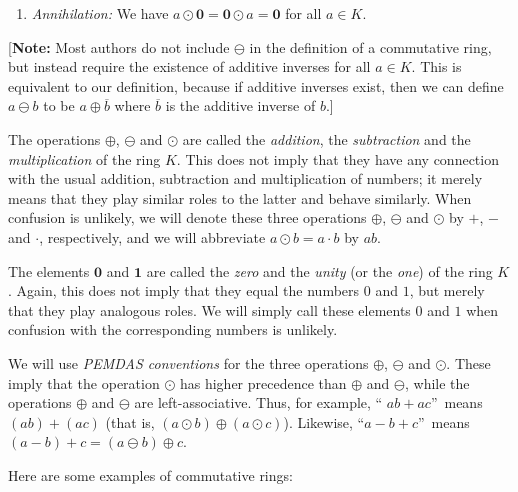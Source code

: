 \begin{definition}
\begin{enumerate}
\item \emph{Annihilation:} We have $a\odot\mathbf{0}=\mathbf{0}\odot
a=\mathbf{0}$ for all $a\in K$.
\end{enumerate}

[\textbf{Note:} Most authors do not include $\ominus$ in the definition of a
commutative ring, but instead require the existence of additive inverses for
all $a\in K$. This is equivalent to our definition, because if additive
inverses exist, then we can define $a\ominus b$ to be $a\oplus\overline{b}$
where $\overline{b}$ is the additive inverse of $b$.]

The operations $\oplus$, $\ominus$ and $\odot$ are called the \emph{addition},
the \emph{subtraction} and the \emph{multiplication} of the ring $K$. This
does not imply that they have any connection with the usual addition,
subtraction and multiplication of numbers; it merely means that they play
similar roles to the latter and behave similarly. When confusion is unlikely,
we will denote these three operations $\oplus$, $\ominus$ and $\odot$ by $+$,
$-$ and $\cdot$, respectively, and we will abbreviate $a\odot b=a\cdot b$ by
$ab$.

The elements $\mathbf{0}$ and $\mathbf{1}$ are called the \emph{zero} and the
\emph{unity} (or the \emph{one}) of the ring $K$. Again, this does not imply
that they equal the numbers $0$ and $1$, but merely that they play analogous
roles. We will simply call these elements $0$ and $1$ when confusion with the
corresponding numbers is unlikely.

We will use \emph{PEMDAS conventions} for the three operations $\oplus$,
$\ominus$ and $\odot$. These imply that the operation $\odot$ has higher
precedence than $\oplus$ and $\ominus$, while the operations $\oplus$ and
$\ominus$ are left-associative. Thus, for example, \textquotedblleft%
$ab+ac$\textquotedblright\ means $\left(  ab\right)  +\left(  ac\right)  $
(that is, $\left(  a\odot b\right)  \oplus\left(  a\odot c\right)  $).
Likewise, \textquotedblleft$a-b+c$\textquotedblright\ means $\left(
a-b\right)  +c=\left(  a\ominus b\right)  \oplus c$.
\end{definition}

Here are some examples of commutative rings:


